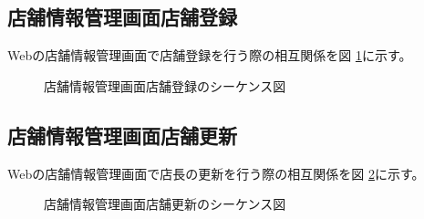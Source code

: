 \documentclass[a4j]{jarticle}
\begin{document}
\subsection{店舗情報管理画面店舗登録}
Webの店舗情報管理画面で店舗登録を行う際の相互関係を図 \ref {tab:oonishi2}に示す。
\begin{figure}[H]
\begin{center}
\caption{店舗情報管理画面店舗登録のシーケンス図}
\label {tab:oonishi2}
\end{center}
\end{figure}
\subsection{店舗情報管理画面店舗更新}
Webの店舗情報管理画面で店長の更新を行う際の相互関係を図 \ref {tab:oonishi3}に示す。
\begin{figure}[H]
\begin{center}
\caption{店舗情報管理画面店舗更新のシーケンス図}
\label{tab:oonishi3}
\end{center}
\end{figure}
\end{document}
